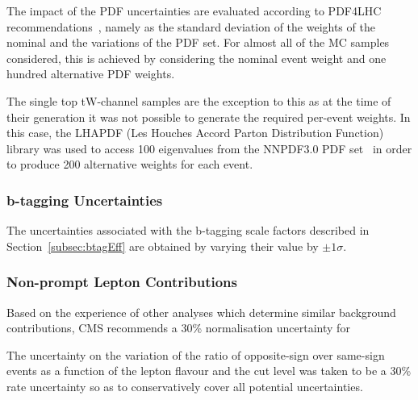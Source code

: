 The impact of the PDF uncertainties are evaluated according to PDF4LHC recommendations~\cite{Butterworth:2015oua}, namely as the standard deviation of the weights of the nominal and the variations of the PDF set.
For almost all of the MC samples considered, this is achieved by considering the nominal event weight and one hundred alternative PDF weights.

The single top tW-channel samples are the exception to this as at the time of their generation it was not possible to generate the required per-event weights.
In this case, the LHAPDF (Les Houches Accord Parton Distribution Function) library was used to access 100 eigenvalues from the NNPDF3.0 PDF set~\cite{Ball:2014uwa} in order to produce 200 alternative weights for each event.

\subsubsection*{b-tagging Uncertainties}
The uncertainties associated with the b-tagging scale factors described in Section~\ref{subsec:btagEff} are obtained by varying their value by $\pm 1\sigma$.

\subsubsection*{Non-prompt Lepton Contributions}
Based on the experience of other analyses which determine similar background contributions, CMS recommends a 30\% normalisation uncertainty for 
 
The uncertainty on the variation of the ratio of opposite-sign over same-sign events as a function of the lepton flavour and the cut level was taken to be a 30\% rate uncertainty so as to conservatively cover all potential uncertainties.


